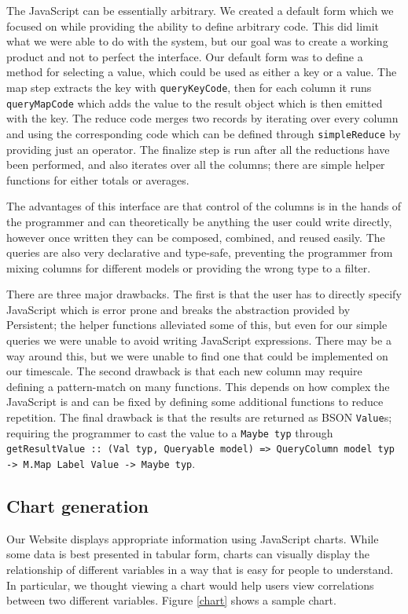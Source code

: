 \documentclass[letterpaper,twocolumn,9pt]{article}
\newcommand{\code}[1]{\texttt{#1}}
\begin{document}
The JavaScript can be essentially arbitrary.  We created a default form which we focused on while providing the ability to define arbitrary code.  This did limit what we were able to do with the system, but our goal was to create a working product and not to perfect the interface.  Our default form was to define a method for selecting a value, which could be used as either a key or a value.  The map step extracts the key with \code{queryKeyCode}, then for each column it runs \code{queryMapCode} which adds the value to the result object which is then emitted with the key.  The reduce code merges two records by iterating over every column and using the corresponding code which can be defined through \code{simpleReduce} by providing just an operator.  The finalize step is run after all the reductions have been performed, and also iterates over all the columns; there are simple helper functions for either totals or averages.

The advantages of this interface are that control of the columns is in the hands of the programmer and can theoretically be anything the user could write directly, however once written they can be composed, combined, and reused easily.  The queries are also very declarative and type-safe, preventing the programmer from mixing columns for different models or providing the wrong type to a filter.

There are three major drawbacks.  The first is that the user has to directly specify JavaScript which is error prone and breaks the abstraction provided by Persistent; the helper functions alleviated some of this, but even for our simple queries we were unable to avoid writing JavaScript expressions.  There may be a way around this, but we were unable to find one that could be implemented on our timescale.  The second drawback is that each new column may require defining a pattern-match on many functions.  This depends on how complex the JavaScript is and can be fixed by defining some additional functions to reduce repetition.  The final drawback is that the results are returned as BSON \code{Value}s; requiring the programmer to cast the value to a \code{Maybe typ} through \code{getResultValue :: (Val typ, Queryable model) => QueryColumn model typ -> M.Map Label Value -> Maybe typ}.

\subsection{Chart generation}

Our Website displays appropriate information using JavaScript charts. While some data is best presented in tabular form, charts can visually display the relationship of different variables in a way that is easy for people to understand. In particular, we thought viewing a chart would help users view correlations between two different variables. Figure \ref{chart} shows a sample chart.
\end{document}
